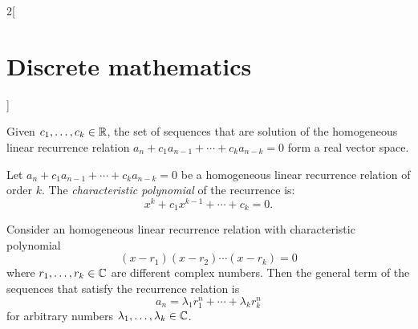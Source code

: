 \documentclass[../../../main.tex]{subfiles}
\begin{document}
\begin{multicols}{2}[\section{Discrete mathematics}]
\begin{prop}
    \end{prop}
    \begin{prop}
        Given $c_1,\ldots,c_k\in\mathbb{R} $, the set of sequences that are solution of the homogeneous linear recurrence relation $a_n+c_1a_{n-1}+\cdots+c_ka_{n-k}=0$ form a real vector space.
    \end{prop}
    \begin{definition}
        Let $a_n+c_1a_{n-1}+\cdots+c_ka_{n-k}=0$ be a homogeneous linear recurrence relation of order $k$. The \textit{characteristic polynomial} of the recurrence is: $$x^k+c_1x^{k-1}+\cdots+c_k=0.$$
    \end{definition}
    \begin{prop}
        Consider an homogeneous linear recurrence relation with characteristic polynomial $$(x-r_1)(x-r_2)\cdots(x-r_k)=0$$ where $r_1,\ldots,r_k\in\mathbb{C} $ are different complex numbers. Then the general term of the sequences that satisfy the recurrence relation is $$a_n=\lambda_1r_1^n+\cdots+\lambda_kr_k^n$$ for arbitrary numbers $\lambda_1,\ldots,\lambda_k\in\mathbb{C} $.
    \end{prop}

\end{multicols}
\end{document}
